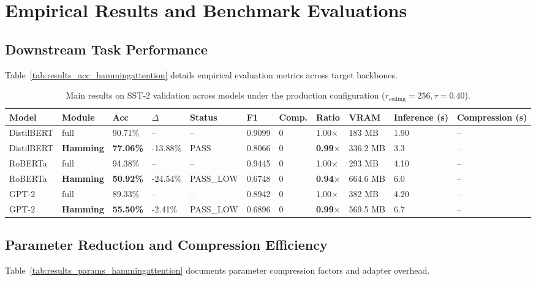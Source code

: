 \section{Empirical Results and Benchmark Evaluations}

\subsection{Downstream Task Performance}
Table~\ref{tab:results_acc_hammingattention} details empirical evaluation metrics across target backbones.

\begin{table}[t]
\centering
\small
\begin{tabular}{lllllllllll}
\toprule
\textbf{Model} & \textbf{Module} & \textbf{Acc} & \textbf{$\Delta$} & \textbf{Status} & \textbf{F1} & \textbf{Comp.} & \textbf{Ratio} & \textbf{VRAM} & \textbf{Inference (s)} & \textbf{Compression (s)} \\
\midrule
DistilBERT & full & 90.71\% & -- & -- & 0.9099 & 0 & 1.00$\times$ & 183 MB & 1.90 & -- \\
DistilBERT & \textbf{Hamming} & \textbf{77.06\%} & -13.88\% & PASS & 0.8066 & 0 & \textbf{0.99$\times$} & 336.2 MB & 3.3 & -- \\
RoBERTa & full & 94.38\% & -- & -- & 0.9445 & 0 & 1.00$\times$ & 293 MB & 4.10 & -- \\
RoBERTa & \textbf{Hamming} & \textbf{50.92\%} & -24.54\% & PASS\_LOW & 0.6748 & 0 & \textbf{0.94$\times$} & 664.6 MB & 6.0 & -- \\
GPT-2 & full & 89.33\% & -- & -- & 0.8942 & 0 & 1.00$\times$ & 382 MB & 4.20 & -- \\
GPT-2 & \textbf{Hamming} & \textbf{55.50\%} & -2.41\% & PASS\_LOW & 0.6896 & 0 & \textbf{0.99$\times$} & 569.5 MB & 6.7 & -- \\
\bottomrule
\end{tabular}
\caption{Main results on SST-2 validation across models under the production configuration ($r_{\mathrm{ceiling}}=256, \tau=0.40$).}
\label{tab:main_sst2}
\end{table}

\subsection{Parameter Reduction and Compression Efficiency}
Table~\ref{tab:results_params_hammingattention} documents parameter compression factors and adapter overhead.

